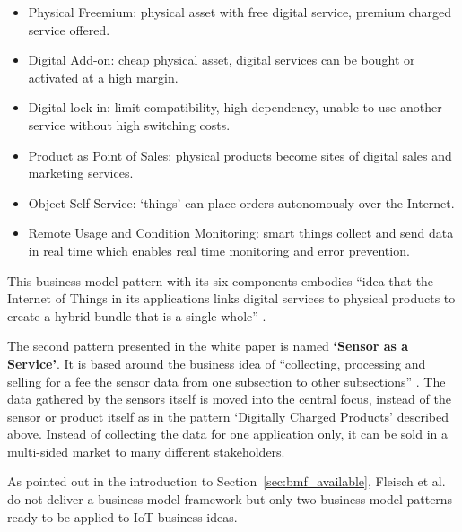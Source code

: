 		\begin{itemize}
			\item Physical Freemium: physical asset with free digital service, premium charged service offered.
			\item Digital Add-on: cheap physical asset, digital services can be bought or activated at a high margin.
			\item Digital lock-in: limit compatibility, high dependency, unable to use another service without high switching costs.
			\item Product as Point of Sales: physical products become  sites of digital sales and marketing services.
			\item Object Self-Service: `things' can place orders autonomously over the Internet. 
			\item Remote Usage and Condition Monitoring: smart things collect and send data in real time which enables real time monitoring and error prevention.
		\end{itemize}

		This business model pattern with its six components embodies ``idea that the Internet of Things in its applications links digital services to physical products to create a hybrid bundle that is a single whole'' \cite[p. 11]{fleisch}. 

		The second pattern presented in the white paper is named \textbf{`Sensor as a Service'}. It is based around the business idea of ``collecting, processing and selling for a fee the sensor data from one subsection to other subsections'' \cite[p. 11]{fleisch}. The data gathered by the sensors itself is moved into the central focus, instead of the sensor or product itself as in the pattern `Digitally Charged Products' described above. Instead of collecting the data for one application only, it can be sold in a multi-sided market to many different stakeholders.

		As pointed out in the introduction to Section~\ref{sec:bmf_available}, Fleisch et al. do not deliver a business model framework but only two business model patterns ready to be applied to IoT business ideas.

